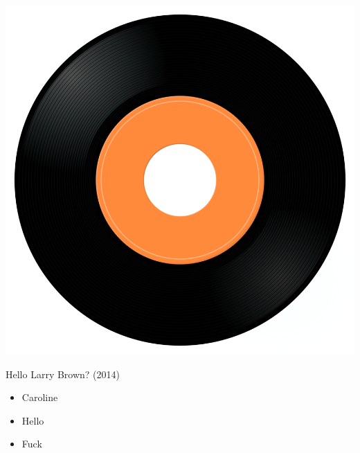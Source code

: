 \begin{minipage}[t]{0.25\textwidth}
\captionsetup{type=figure}
\includegraphics[width=\textwidth]{Images/cover.png}
\caption*{Hello Larry Brown? (2014)}
\end{minipage}
\begin{minipage}[t]{0.25\textwidth}\vspace{0pt}
\begin{itemize}[nosep,leftmargin=1em,labelwidth=*,align=left]
	\setlength{\itemsep}{0pt}
	\item Caroline
	\item Hello
	\item Fuck
\end{itemize}
\end{minipage}
